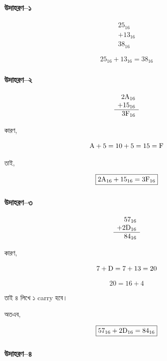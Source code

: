 \subsubsection*{উদাহরণ--১}

\[
\begin{array}{r}
25_{16}\\
+13_{16}\\
\hline
38_{16}
\end{array}
\]

\[
\boxed{25_{16}+13_{16}=38_{16}}
\]

\subsubsection*{উদাহরণ--২}

\[
\begin{array}{r}
2\text{\textenglish{A}}_{16}\\
+15_{16}\\
\hline
3\text{\textenglish{F}}_{16}
\end{array}
\]

কারণ,

\[
\text{\textenglish{A}}+5
=
10+5
=
15
=
\text{\textenglish{F}}
\]

তাই,

\[
\boxed{
2\text{\textenglish{A}}_{16}
+
15_{16}
=
3\text{\textenglish{F}}_{16}
}
\]

\subsubsection*{উদাহরণ--৩}

\[
\begin{array}{r}
57_{16}\\
+2\text{\textenglish{D}}_{16}\\
\hline
84_{16}
\end{array}
\]

কারণ,

\[
7+\text{\textenglish{D}}
=
7+13
=
20
\]

\[
20=16+4
\]

তাই ৪ লিখে ১
\textenglish{carry} হবে।

অতএব,

\[
\boxed{
57_{16}
+
2\text{\textenglish{D}}_{16}
=
84_{16}
}
\]

\subsubsection*{উদাহরণ--৪}

